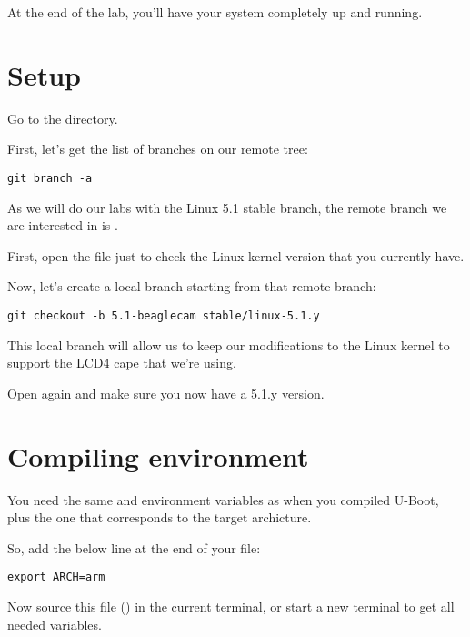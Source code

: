 
At the end of the lab, you'll have your system completely up and
running.

\section{Setup}

Go to the  directory.

First, let's get the list of branches on our  remote tree:

\begin{verbatim}
git branch -a
\end{verbatim}

As we will do our labs with the Linux 5.1 stable branch, the remote branch
we are interested in is .

First, open the  file just to check the Linux kernel
version that you currently have.

Now, let's create a local branch starting from that remote branch:
\begin{verbatim}
git checkout -b 5.1-beaglecam stable/linux-5.1.y
\end{verbatim}

This local branch will allow us to keep our modifications to the Linux
kernel to support the LCD4 cape that we're using.

Open  again and make sure you now have a 5.1.y version.

\section{Compiling environment}

You need the same  and  environment
variables as when you compiled U-Boot, plus the  one that
corresponds to the target archicture.

So, add the below line at the end of your  file:

\begin{verbatim}
export ARCH=arm
\end{verbatim}

Now source this file ()  in the current terminal,
or start a new terminal to get all needed variables.


